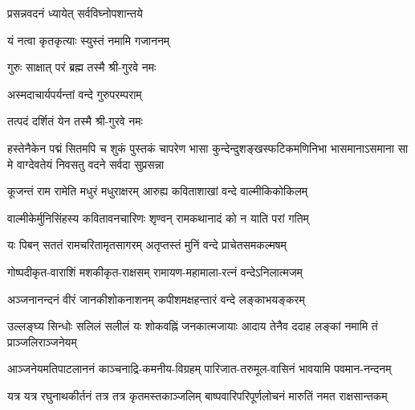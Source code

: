 

{प्रसन्नवदनं ध्यायेत् सर्वविघ्नोपशान्तये}

{यं नत्वा कृतकृत्याः स्युस्तं नमामि गजाननम्}


{गुरुः साक्षात् परं ब्रह्म तस्मै श्री-गुरवे नमः}

{अस्मदाचार्यपर्यन्तां वन्दे गुरुपरम्पराम्}

{तत्पदं दर्शितं येन तस्मै श्री-गुरवे नमः}

{हस्तेनैकेन पद्मं सितमपि च शुकं पुस्तकं चापरेण}
{भासा कुन्देन्दुशङ्खस्फटिकमणिनिभा भासमानाऽसमाना}
{सा मे वाग्देवतेयं निवसतु वदने सर्वदा सुप्रसन्ना}

\medskip
{}

\twolineshloka
{कूजन्तं राम रामेति मधुरं मधुराक्षरम्}
{आरुह्य कविताशाखां वन्दे वाल्मीकिकोकिलम्}

\twolineshloka
{वाल्मीकेर्मुनिसिंहस्य कवितावनचारिणः}
{शृण्वन् रामकथानादं को न याति परां गतिम्}

\twolineshloka
{यः पिबन् सततं रामचरितामृतसागरम्}
{अतृप्तस्तं मुनिं वन्दे प्राचेतसमकल्मषम्}

\resetShloka
{}

\twolineshloka
{गोष्पदीकृत-वाराशिं मशकीकृत-राक्षसम्}
{रामायण-महामाला-रत्नं वन्देऽनिलात्मजम्}

\twolineshloka
{अञ्जनानन्दनं वीरं जानकीशोकनाशनम्}
{कपीशमक्षहन्तारं वन्दे लङ्काभयङ्करम्}

\fourlineindentedshloka
{उल्लङ्घ्य सिन्धोः सलिलं सलीलं}
{यः शोकवह्निं जनकात्मजायाः}
{आदाय तेनैव ददाह लङ्कां}
{नमामि तं प्राञ्जलिराञ्जनेयम्}

\fourlineindentedshloka
{आञ्जनेयमतिपाटलाननं}
{काञ्चनाद्रि-कमनीय-विग्रहम्}
{पारिजात-तरुमूल-वासिनं}
{भावयामि पवमान-नन्दनम्}

\fourlineindentedshloka
{यत्र यत्र रघुनाथकीर्तनं}
{तत्र तत्र कृतमस्तकाञ्जलिम्}
{बाष्पवारिपरिपूर्णलोचनं}
{मारुतिं नमत राक्षसान्तकम्}

